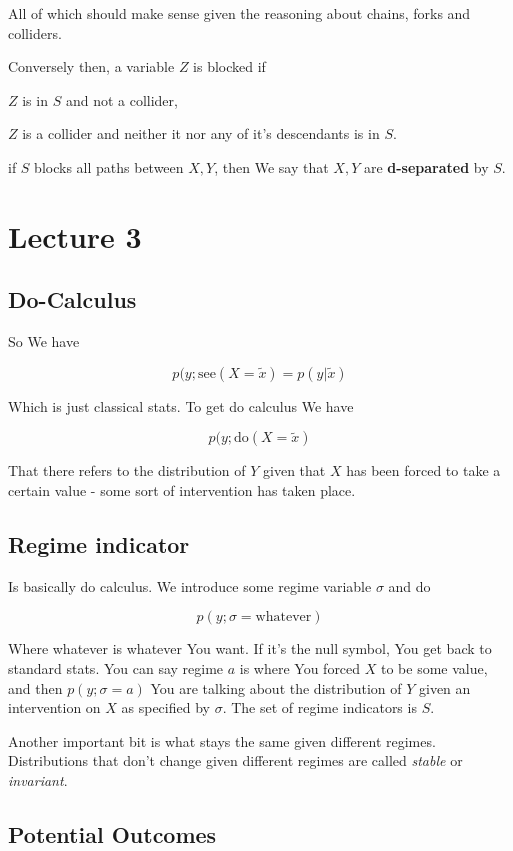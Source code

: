 \documentclass{article}
\begin{document}
		 All of which should make sense given the reasoning about chains, forks and colliders. 
		 
		 Conversely then, a variable $Z$ is blocked if
		 
		 $Z$ is in $S$ and not a collider,
		 
		 $Z$ is a collider and neither it nor any of it's descendants is in $S$.
		 
		 if $S$ blocks all paths between $X, Y$, then We say that $X, Y$ are \textbf{d-separated} by $S$.
		 
	\section{Lecture 3}
	
		\subsection{Do-Calculus}
		
			So We have
			
			\[ p(y;\text{see}(X=\tilde{x}) = p(y|\tilde{x}) \]
		 
		 	Which is just classical stats. To get do calculus We have
		 
			\[ p(y;\text{do}(X=\tilde{x})\]
		 
		 	That there refers to the distribution of $Y$ given that $X$ has been forced to take a certain value - some sort of intervention has taken place.
		 	
		\subsection{Regime indicator}
		
			Is basically do calculus. We introduce some regime variable $\sigma$ and do 
			
			\[ p(y;\sigma=\text{whatever}) \]
		 
		 	Where whatever is whatever You want. If it's the null symbol, You get back to standard stats. You can say regime $a$ is where You forced $X$ to be some value, and then $p(y;\sigma=a)$ You are talking about the distribution of $Y$ given an intervention on $X$ as specified by $\sigma$. The set of regime indicators is $S$.
		 
		 	Another important bit is what stays the same given different regimes. Distributions that don't change given different regimes are called \textit{stable} or \textit{invariant}.
		 	
		\subsection{Potential Outcomes}
		
\end{document}
